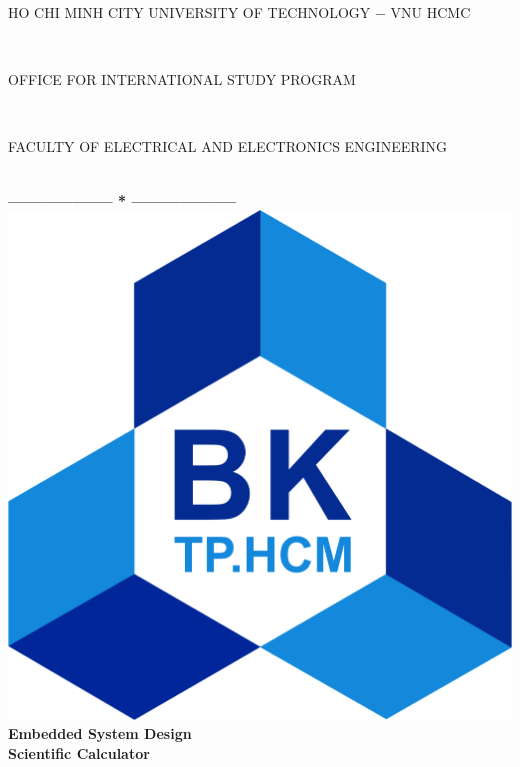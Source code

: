 \documentclass[a4paper, twoside]{report}
\begin{document}
\fontsize{13pt}{18pt}\selectfont
\begin{titlepage}


\begin{center}
\begin{large}
HO CHI MINH CITY UNIVERSITY OF TECHNOLOGY $-$ VNU HCMC
\end{large} \\
\begin{large}
OFFICE FOR INTERNATIONAL STUDY PROGRAM
\end{large} \\
\begin{large}
FACULTY OF ELECTRICAL AND ELECTRONICS ENGINEERING
\end{large} \\
\textbf{--------------------  *  --------------------}\\[1.5cm]
\includegraphics[scale=0.1]{logobk.png}\\[1.5cm]
{\fontsize{19pt}{1}\bfseries \selectfont Embedded System Design}\\[0.2cm]
{\fontsize{21pt}{1}\bfseries\selectfont Scientific Calculator
}\\[3.3cm]
\end{center}


\end{titlepage}
\end{document}
